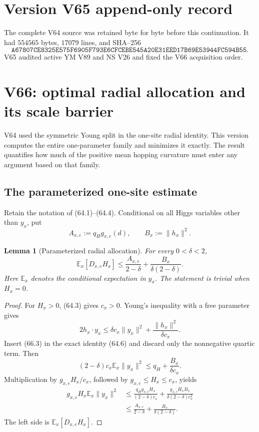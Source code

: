 \documentclass[11pt]{article}
\newtheorem{lemma}[theorem]{Lemma}
\theoremstyle{remark}
\begin{document}
\section*{Version V65 append-only record}
The complete V64 source was retained byte for byte before this
continuation.  It had \(554565\) bytes, \(17079\) lines, and SHA--256
\[
 \texttt{A67807CE8325E575F6905F793E6CFCEBE545A20E31EED17B69E53944FC594B55}.
\]
V65 audited active YM V89 and NS V26 and fixed the V66 acquisition order.


\section{V66: optimal radial allocation and its scale barrier}
\label{sec:v17v66}

V64 used the symmetric Young split in the one-site radial identity.
This version computes the entire one-parameter family and minimizes it
exactly.  The result quantifies how much of the positive mean hopping
curvature must enter any argument based on that family.

\subsection{The parameterized one-site estimate}

Retain the notation of (64.1)--(64.4).  Conditional on all Higgs
variables other than \(y_x\), put
\[
 A_{x,e}:=q_Hg_{x,e}(d),
 \qquad B_x:=\|h_x\|^2.                            \tag{66.1}
\]

\begin{lemma}[Parameterized radial allocation]
\label{lem:v17v66-delta}
For every \(0<\delta<2\),
\[
 \mathbb E_x[D_{x,e}H_x]
 \leq
 \frac{A_{x,e}}{2-\delta}
 +\frac{B_x}{\delta(2-\delta)}.                  \tag{66.2}
\]
Here \(\mathbb E_x\) denotes the conditional expectation in \(y_x\).
The statement is trivial when \(H_x=0\).
\end{lemma}

\begin{proof}
For \(H_x>0\), (64.3) gives \(c_x>0\).  Young's inequality with a
free parameter gives
\[
 2h_x\cdot y_x
 \leq\delta c_x\|y_x\|^2+
       \frac{\|h_x\|^2}{\delta c_x}.              \tag{66.3}
\]
Insert (66.3) in the exact identity (64.6) and discard only the
nonnegative quartic term.  Then
\[
 (2-\delta)c_x\mathbb E_x\|y_x\|^2
 \leq q_H+\frac{B_x}{\delta c_x}.                 \tag{66.4}
\]
Multiplication by \(g_{x,e}H_x/c_x\), followed by
\(g_{x,e}\leq H_x\leq c_x\), yields
\[
\begin{aligned}
 g_{x,e}H_x\mathbb E_x\|y_x\|^2
 &\leq
 \frac{q_Hg_{x,e}H_x}{(2-\delta)c_x}
 +\frac{g_{x,e}H_xB_x}{\delta(2-\delta)c_x^2}\\
 &\leq
 \frac{A_{x,e}}{2-\delta}
 +\frac{B_x}{\delta(2-\delta)}.
\end{aligned}                                      \tag{66.5}
\]
The left side is \(\mathbb E_x[D_{x,e}H_x]\).
\end{proof}
\end{document}
